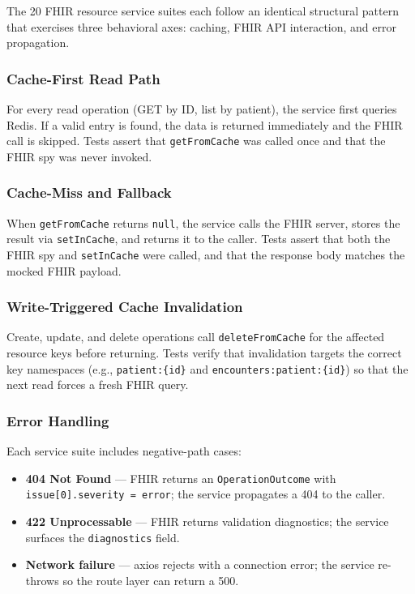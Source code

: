 The 20 FHIR resource service suites each follow an identical structural pattern
that exercises three behavioral axes: caching, FHIR API interaction, and error
propagation.

\subsubsection{Cache-First Read Path}
For every read operation (GET by ID, list by patient), the service first queries
Redis. If a valid entry is found, the data is returned immediately and the FHIR
call is skipped. Tests assert that \texttt{getFromCache} was called once and that
the FHIR spy was never invoked.

\subsubsection{Cache-Miss and Fallback}
When \texttt{getFromCache} returns \texttt{null}, the service calls the FHIR
server, stores the result via \texttt{setInCache}, and returns it to the caller.
Tests assert that both the FHIR spy and \texttt{setInCache} were called, and that
the response body matches the mocked FHIR payload.

\subsubsection{Write-Triggered Cache Invalidation}
Create, update, and delete operations call \texttt{deleteFromCache} for the
affected resource keys before returning. Tests verify that invalidation targets
the correct key namespaces (e.g., \texttt{patient:\{id\}} and
\texttt{encounters:patient:\{id\}}) so that the next read forces a fresh FHIR
query.

\subsubsection{Error Handling}
Each service suite includes negative-path cases:
\begin{itemize}
  \item \textbf{404 Not Found} --- FHIR returns an \texttt{OperationOutcome} with
        \texttt{issue[0].severity = error}; the service propagates a 404 to the
        caller.
  \item \textbf{422 Unprocessable} --- FHIR returns validation diagnostics; the
        service surfaces the \texttt{diagnostics} field.
  \item \textbf{Network failure} --- axios rejects with a connection error; the
        service re-throws so the route layer can return a 500.
\end{itemize}

